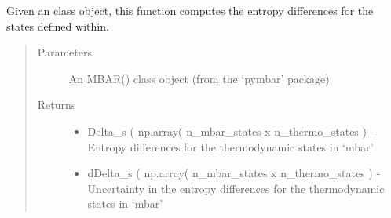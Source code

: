 \documentclass[letterpaper,12pt,english,openany,oneside]{sphinxmanual}
\begin{document}
\begin{fulllineitems}
\label{\detokenize{thermo:parameters.reweight.get_entropy_differences}}
Given an  class object, this function computes the entropy differences for the states defined within.
\begin{quote}\begin{description}
\item[{Parameters}] \leavevmode
{} \textendash{} An MBAR() class object (from the ‘pymbar’ package)

\item[{Returns}] \leavevmode
\begin{itemize}
\item {} 
Delta\_s ( np.array( n\_mbar\_states x n\_thermo\_states ) - Entropy differences for the thermodynamic states in ‘mbar’

\item {} 
dDelta\_s ( np.array( n\_mbar\_states x n\_thermo\_states ) - Uncertainty in the entropy differences for the thermodynamic states in ‘mbar’

\end{itemize}


\end{description}\end{quote}

\end{fulllineitems}

\end{document}
